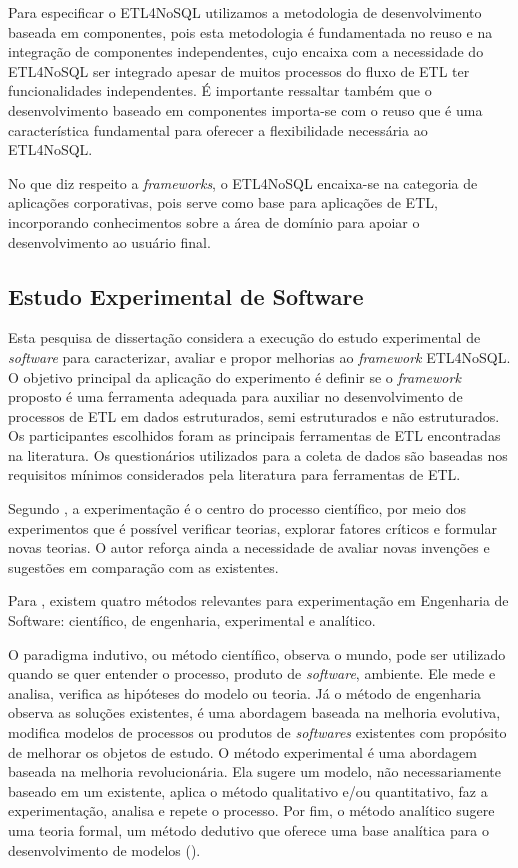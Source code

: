 Para especificar o ETL4NoSQL utilizamos a metodologia de desenvolvimento baseada em componentes, pois esta metodologia é fundamentada no reuso e na integração de componentes independentes, cujo encaixa com a necessidade do ETL4NoSQL ser integrado apesar de muitos processos do fluxo de ETL ter funcionalidades independentes. É importante ressaltar também que o desenvolvimento baseado em componentes importa-se com o reuso que é uma característica fundamental para oferecer a flexibilidade necessária ao ETL4NoSQL.

No que diz respeito a \textit{frameworks}, o ETL4NoSQL encaixa-se na categoria de aplicações corporativas, pois serve como base para aplicações de ETL, incorporando conhecimentos sobre a área de domínio para apoiar o desenvolvimento ao usuário final.




\subsection{Estudo Experimental de Software}

Esta pesquisa de dissertação considera a execução do estudo experimental de \textit{software} para caracterizar, avaliar e propor melhorias ao \textit{framework} ETL4NoSQL. O objetivo principal da aplicação do experimento é definir se o \textit{framework} proposto é uma ferramenta adequada para auxiliar no desenvolvimento de processos de ETL em dados estruturados, semi estruturados e não estruturados. Os participantes escolhidos foram as principais ferramentas de ETL encontradas na literatura. Os questionários utilizados para a coleta de dados são baseadas nos requisitos mínimos considerados pela literatura para ferramentas de ETL.

Segundo \cite{travassos:2002}, a experimentação é o centro do processo científico, por meio dos experimentos que é possível verificar teorias, explorar fatores críticos e formular novas teorias. O autor reforça ainda a necessidade de avaliar novas invenções e sugestões em comparação com as existentes.

Para \cite{wohlin:2000}, existem quatro métodos relevantes para experimentação em Engenharia de Software: científico, de engenharia, experimental e analítico. 

O paradigma indutivo, ou método científico, observa o mundo, pode ser utilizado quando se quer entender o processo, produto de \textit{software}, ambiente. Ele mede e analisa, verifica as hipóteses do modelo ou teoria.  Já o método de engenharia observa as soluções existentes, é uma abordagem baseada na melhoria evolutiva, modifica modelos de processos ou produtos de \textit{softwares} existentes com propósito de melhorar os objetos de estudo. O método experimental é uma abordagem baseada na melhoria revolucionária. Ela sugere um modelo, não necessariamente baseado em um existente, aplica o método qualitativo e/ou quantitativo, faz a experimentação, analisa e repete o processo. Por fim, o método analítico sugere uma teoria formal, um método dedutivo que oferece uma base analítica para o desenvolvimento de modelos (\cite{travassos:2002}).

